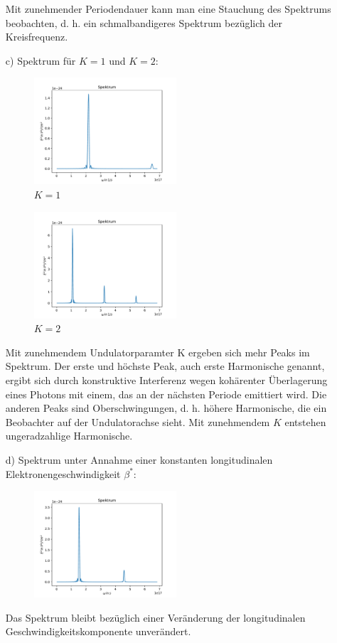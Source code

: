 \documentclass[11pt,a4paper]{article}
\begin{document}
\begin{itemize}
			Mit zunehmender Periodendauer kann man eine Stauchung des Spektrums beobachten, d. h. ein schmalbandigeres Spektrum 
			bezüglich der Kreisfrequenz.

			\item[c)] Spektrum für $K = 1$ und $K = 2$:
			\begin{figure}[H]
				\centering
				\includegraphics[width=0.5\textwidth]{build/spektrum_K1.0_Perioden20_neu.pdf}
				\caption{$K=1$}
			\end{figure}

			\begin{figure}[H]
				\centering
				\includegraphics[width=0.5\textwidth]{build/spektrum_K2.0_Perioden20_neu.pdf}
				\caption{$K=2$}
			\end{figure}

			Mit zunehmendem Undulatorparamter K ergeben sich mehr Peaks im Spektrum. Der erste und höchste Peak, auch erste Harmonische genannt, ergibt sich durch konstruktive Interferenz 
			wegen kohärenter Überlagerung eines Photons mit einem, das an der nächsten Periode emittiert wird. Die anderen Peaks sind Oberschwingungen, d. h. höhere Harmonische, die ein
			Beobachter auf der Undulatorachse sieht. Mit zunehmendem $K$ entstehen ungeradzahlige Harmonische.
		

			\item[d)] Spektrum unter Annahme einer konstanten longitudinalen Elektronengeschwindigkeit $\beta^{*}$:

			\begin{figure}[H]
				\centering
				\includegraphics[width=0.5\textwidth]{build/spektrum_K1.5_Perioden20_d.pdf}
			\end{figure}

			Das Spektrum bleibt bezüglich einer Veränderung der longitudinalen Geschwindigkeitskomponente unverändert.

		\end{itemize}
\end{document}
